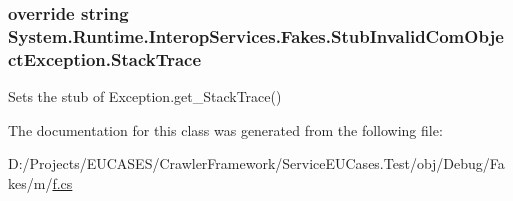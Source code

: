 \hypertarget{class_system_1_1_runtime_1_1_interop_services_1_1_fakes_1_1_stub_invalid_com_object_exception_a66e5475d5c001bba2f76a91496d6fd68}{
\subsubsection[{Stack\-Trace}]{\setlength{\rightskip}{0pt plus 5cm}override string System.\-Runtime.\-Interop\-Services.\-Fakes.\-Stub\-Invalid\-Com\-Object\-Exception.\-Stack\-Trace\hspace{0.3cm}{\ttfamily [get]}}}\label{class_system_1_1_runtime_1_1_interop_services_1_1_fakes_1_1_stub_invalid_com_object_exception_a66e5475d5c001bba2f76a91496d6fd68}


Sets the stub of Exception.\-get\-\_\-\-Stack\-Trace()



The documentation for this class was generated from the following file\-:\begin{DoxyCompactItemize}
\item 
D\-:/\-Projects/\-E\-U\-C\-A\-S\-E\-S/\-Crawler\-Framework/\-Service\-E\-U\-Cases.\-Test/obj/\-Debug/\-Fakes/m/\hyperlink{m_2f_8cs}{f.\-cs}\end{DoxyCompactItemize}

